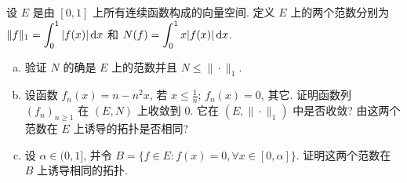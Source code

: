 \begin{exercise}
     设 $E$ 是由 $[0,1]$ 上所有连续函数构成的向量空间. 
    定义 $E$ 上的两个范数分别为 $\displaystyle\|f\|_1=\int_0^1|f(x)|\mathop{}\!\mathrm{d} x$ 和 $\displaystyle N(f)=\int_0^1x|f(x)|\mathop{}\!\mathrm{d} x$.
    \begin{enumerate}[(a)]
        \item 验证 $N$ 的确是 $E$ 上的范数并且 $N\leq\|\cdot\|_1$.
        \item 设函数 $f_n(x)=n-n^2x$, 若 $x\leq\frac{1}{n}$; $f_n(x)=0$, 其它. 
              证明函数列 $(f_n)_{n\geq 1}$ 在 $(E,N)$ 上收敛到 0. 它在 $(E,\|\cdot\|_1)$ 中是否收敛? 由这两个范数在 $E$ 上诱导的拓扑是否相同?
        \item 设 $\alpha\in(0,1]$, 并令 $B=\{f\in E:f(x)=0,\forall x\in[0,\alpha]\}$. 证明这两个范数在 $B$ 上诱导相同的拓扑.
    \end{enumerate}
\end{exercise}

